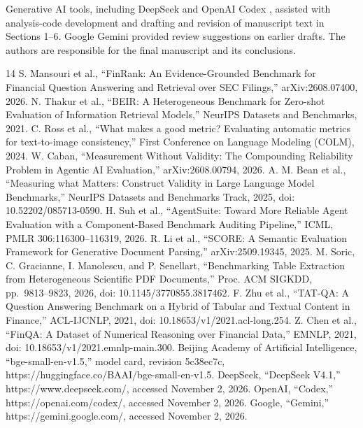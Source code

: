 \documentclass[runningheads]{llncs}
\begin{document}
Generative AI tools, including DeepSeek \cite{r12} and OpenAI Codex
\cite{r13}, assisted with analysis-code development and drafting and
revision of manuscript text in Sections 1--6. Google Gemini \cite{r14}
provided review suggestions on earlier drafts. The authors are
responsible for the final manuscript and its conclusions.
\begin{thebibliography}{14}
 S. Mansouri et al., ``FinRank: An Evidence-Grounded Benchmark for
Financial Question Answering and Retrieval over SEC Filings,''
arXiv:2608.07400, 2026.
 N. Thakur et al., ``BEIR: A Heterogeneous Benchmark for Zero-shot
Evaluation of Information Retrieval Models,'' NeurIPS Datasets and
Benchmarks, 2021.
 C. Ross et al., ``What makes a good metric? Evaluating automatic metrics
for text-to-image consistency,'' First Conference on Language Modeling
(COLM), 2024.
 W. Caban, ``Measurement Without Validity: The Compounding Reliability
Problem in Agentic AI Evaluation,'' arXiv:2608.00794, 2026.
 A. M. Bean et al., ``Measuring what Matters: Construct Validity in Large
Language Model Benchmarks,'' NeurIPS Datasets and Benchmarks Track,
2025, doi: 10.52202/085713-0590.
 H. Suh et al., ``AgentSuite: Toward More Reliable Agent Evaluation with
a Component-Based Benchmark Auditing Pipeline,'' ICML, PMLR
306:116300--116319, 2026.
 R. Li et al., ``SCORE: A Semantic Evaluation Framework for Generative
Document Parsing,'' arXiv:2509.19345, 2025.
 M. Soric, C. Gracianne, I. Manolescu, and P. Senellart, ``Benchmarking
Table Extraction from Heterogeneous Scientific PDF Documents,'' Proc.
ACM SIGKDD, pp.~9813--9823, 2026, doi: 10.1145/3770855.3817462.
 F. Zhu et al., ``TAT-QA: A Question Answering Benchmark on a Hybrid of
Tabular and Textual Content in Finance,'' ACL-IJCNLP, 2021, doi:
10.18653/v1/2021.acl-long.254.
 Z. Chen et al., ``FinQA: A Dataset of Numerical Reasoning over Financial
Data,'' EMNLP, 2021, doi: 10.18653/v1/2021.emnlp-main.300.
 Beijing Academy of Artificial Intelligence, ``bge-small-en-v1.5,'' model
card, revision 5c38ec7c, https://huggingface.co/BAAI/bge-small-en-v1.5.
 DeepSeek, ``DeepSeek V4.1,'' https://www.deepseek.com/, accessed
November 2, 2026.
 OpenAI, ``Codex,'' https://openai.com/codex/, accessed November 2, 2026.
 Google, ``Gemini,'' https://gemini.google.com/, accessed November 2,
2026.
\end{thebibliography}
\end{document}
